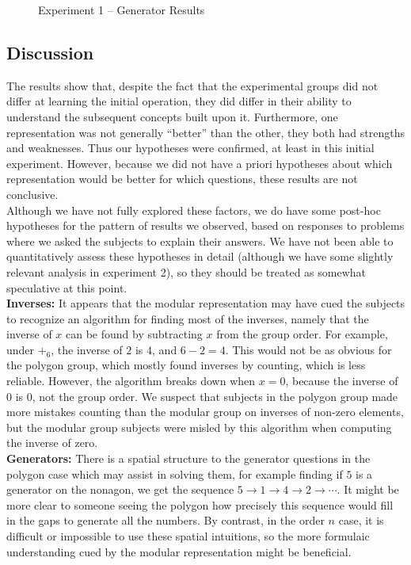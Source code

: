 \documentclass[11pt]{article}
\begin{document}
\begin{figure}[H]
\begin{subfigure}[c]{0.4\textwidth}
\end{subfigure}
\caption{Experiment 1 -- Generator Results}
\label{ex1_gen}
\end{figure}\noindent 
\subsection{Discussion}
The results show that, despite the fact that the experimental groups did not differ at learning the initial operation, they did differ in their ability to understand the subsequent concepts built upon it. Furthermore, one representation was not generally ``better'' than the other, they both had strengths and weaknesses. Thus our hypotheses were confirmed, at least in this initial experiment. However, because we did not have a priori hypotheses about which representation would be better for which questions, these results are not conclusive. \\[11pt]
Although we have not fully explored these factors, we do have some post-hoc hypotheses for the pattern of results we observed, based on responses to problems where we asked the subjects to explain their answers. We have not been able to quantitatively assess these hypotheses in detail (although we have some slightly relevant analysis in experiment 2), so they should be treated as somewhat speculative at this point.\\[11pt]
\textbf{Inverses:} It appears that the modular representation may have cued the subjects to recognize an algorithm for finding most of the inverses, namely that the inverse of $x$ can be found by subtracting $x$ from the group order. For example, under $+_6$, the inverse of $2$ is $4$, and $6-2 = 4$. This would not be as obvious for the polygon group, which mostly found inverses by counting, which is less reliable. However, the algorithm breaks down when $x = 0$, because the inverse of $0$ is $0$, not the group order. We suspect that subjects in the polygon group made more mistakes counting than the modular group on inverses of non-zero elements, but the modular group subjects were misled by this algorithm when computing the inverse of zero. \\[11pt]
\textbf{Generators:} There is a spatial structure to the generator questions in the polygon case which may assist in solving them, for example finding if $5$ is a generator on the nonagon, we get the sequence $5 \rightarrow 1 \rightarrow 4 \rightarrow 2 \rightarrow \cdots$. It might be more clear to someone seeing the polygon how precisely this sequence would fill in the gaps to generate all the numbers. By contrast, in the order $n$ case, it is difficult or impossible to use these spatial intuitions, so the more formulaic understanding cued by the modular representation might be beneficial.
\end{document}
